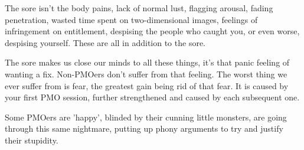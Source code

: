 The sore isn't the body pains, lack of normal lust, flagging arousal, fading penetration, wasted time spent on two-dimensional images, feelings of infringement on entitlement, despising the people who caught you, or even worse, despising yourself. These are all in addition to the sore.

The sore makes us close our minds to all these things, it's that panic feeling of wanting a fix. Non-PMOers don't suffer from that feeling. The worst thing we ever suffer from is fear, the greatest gain being rid of that fear. It is caused by your first PMO session, further strengthened and caused by each subsequent one.

Some PMOers are 'happy', blinded by their cunning little monsters, are going through this same nightmare, putting up phony arguments to try and justify their stupidity.

